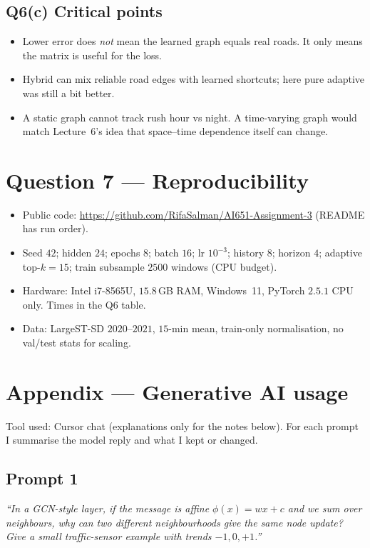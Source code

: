 \documentclass[11pt,a4paper]{article}
\begin{document}
\subsection*{Q6(c) Critical points}
\begin{itemize}
\item Lower error does \emph{not} mean the learned graph equals real roads. It only means the matrix is useful for the loss.
\item Hybrid can mix reliable road edges with learned shortcuts; here pure adaptive was still a bit better.
\item A static graph cannot track rush hour vs night. A time-varying graph would match Lecture~6's idea that space--time dependence itself can change.
\end{itemize}

\section*{Question 7 --- Reproducibility}

\begin{itemize}
\item Public code: \url{https://github.com/RifaSalman/AI651-Assignment-3} (README has run order).
\item Seed $42$; hidden $24$; epochs $8$; batch $16$; lr $10^{-3}$; history $8$; horizon $4$; adaptive top-$k=15$; train subsample $2500$ windows (CPU budget).
\item Hardware: Intel i7-8565U, $15.8$\,GB RAM, Windows~11, PyTorch $2.5.1$ CPU only. Times in the Q6 table.
\item Data: LargeST-SD $2020$--$2021$, $15$-min mean, train-only normalisation, no val/test stats for scaling.
\end{itemize}

\section*{Appendix --- Generative AI usage}
Tool used: Cursor chat (explanations only for the notes below). For each prompt I summarise the model reply and what I kept or changed.

\subsection*{Prompt 1}
\textit{``In a GCN-style layer, if the message is affine $\phi(x)=wx+c$ and we sum over neighbours, why can two different neighbourhoods give the same node update? Give a small traffic-sensor example with trends $-1,0,+1$.''}
\end{document}
